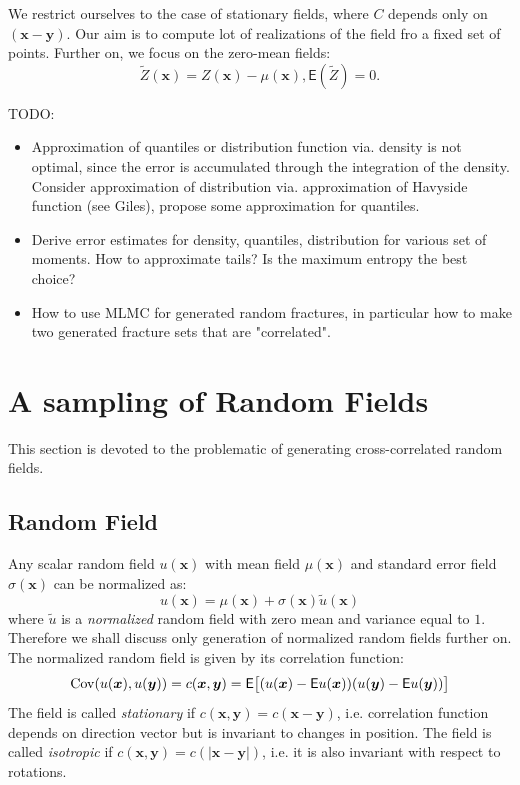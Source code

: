 \documentclass{article}
\def\vc#1{\mathbf{\boldsymbol{#1}}}     %
\def \E{{\mathsf E}}
\begin{document}
We restrict ourselves to the case of stationary fields, where $C$ depends only on $(\vc x - \vc y)$. Our aim is to compute lot of realizations of the field fro a fixed set of points. Further on, we focus on the zero-mean fields:
\[
    \tilde Z(\vc x) = Z(\vc x) - \mu(\vc x), \E(\tilde Z) = 0.
\]

TODO:
\begin{itemize}
\item Approximation of quantiles or distribution function via. density is not optimal, since the error is accumulated through the integration of the density. Consider approximation of distribution via. approximation of Havyside function (see Giles), propose some approximation for quantiles.

\item Derive error estimates for density, quantiles, distribution  for various set of moments. How to approximate tails? Is the maximum entropy the best choice?

\item How to use MLMC for generated random fractures, in particular how to make two generated fracture sets that are "correlated".
\end{itemize}


\section{A sampling of Random Fields}
This section is devoted to the problematic of generating cross-correlated random fields.

\subsection{Random Field}
Any scalar random field $u(\vc x)$ with mean field $\mu(\vc x)$ and standard error
field $\sigma(\vc x)$ can be normalized as:
\[
    u(\vc x) = \mu(\vc x) + \sigma(\vc x) \tilde{u}(\vc x)
\]
where $\tilde{u}$ is a \emph{normalized} random field with zero mean and variance equal to $1$. Therefore we shall discuss only generation of normalized random fields further on. The normalized random field is given by its correlation function:
\[
    {\rm Cov}(u(\vc x), u(\vc y) ) = c(\vc x, \vc y)  
    = \E\big[ (u(\vc x) - \E u(\vc x))(u(\vc y) - \E u(\vc y)) \big]
\]
The field is called \emph{stationary} if $c(\vc x, \vc y) = c(\vc x - \vc y)$, i.e. 
correlation function depends on direction vector but is invariant to changes in position. The field is called \emph{isotropic} if $c(\vc x, \vc y) = c(|\vc x - \vc y|)$, i.e. it is also invariant with respect to rotations. 
\end{document}
